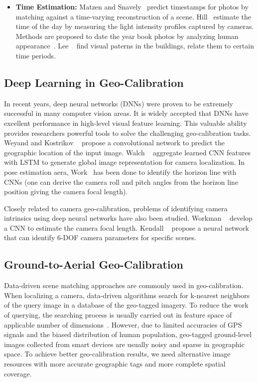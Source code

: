 \begin{itemize}[noitemsep]
\item \textbf{Time Estimation:}
Matzen and Snavely~\cite{matzen2014scene} predict
timestamps for photos by matching against a time-varying
reconstruction of a scene.  Hill~\cite{hill1994elephant} estimate the
time of the day by measuring the light intensity profiles captured by
cameras. Methods are proposed to date the
year book photos by analyzing human
appearance~\cite{salem2016face2year,ginosar2015century}. Lee
\etal~\cite{linking2015iccp} find visual paterns in the buildings,
relate them to certain time periods.
\newline

\end{itemize}

\subsection{Deep Learning in Geo-Calibration}
In recent years, deep neural networks (DNNs) were proven to be
extremely successful in many computer vision areas. 
It is widely accepted that DNNs have excellent performance in
high-level visual feature learning.
This valuable ability provides researchers powerful tools to
solve the challenging geo-calibration tasks.
Weyand and Kostrikov \etal~\cite{planet} propose a convolutional
network to predict the geographic location of the input
image. Walch \etal~\cite{walch2017image} aggregate learned CNN
features with LSTM to generate global image representation for camera
localization.  In pose estimation aera, Work~\cite{zhai2016horizon,
workman2016horizon, hold2017perceptual} has been done to identify
the horizon line with CNNs (one can derive the camera roll and pitch
angles from the horizon line position giving the camera focal length).

Closely related to camera geo-calibration, problems of identifying
camera intrinsics using deep neural networks have also been studied.
Workman \etal~\cite{workman2015deepfocal} develop a CNN to estimate the camera
focal length. Kendall \etal~\cite{kendall2015convolutional} propose a
neural network that can identify 6-DOF camera parameters for specific
scenes.


\subsection{Ground-to-Aerial Geo-Calibration}
Data-driven scene matching approaches are commonly used in
geo-calibration.
When localizing a camera, data-driven algorithms search for k-nearest
neighbors of the query image in a database of the geo-tagged imagery.
To reduce the work of querying, the searching process is usually
carried out in feature space of applicable number of  
dimensions~\cite{im2gps, li2010location,zamir2010accurate}.
However, due to limited accuracies of GPS signals and the biased
distribution of human population, geo-tagged ground-level images
collected from smart devices are usually noisy and sparse in
geographic space. To achieve better geo-calibration results, we
need alternative image resources with more accurate geographic tags
and more complete spatial coverage.


